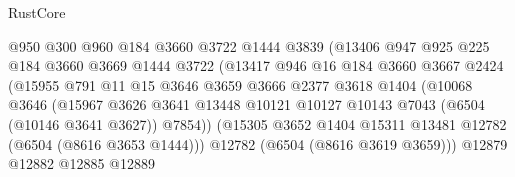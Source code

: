 \begin{lexlean}{RustCore}
\begin{coremodule}
                                @950
                                @300
                                @960
                                @184
                                @3660
                                @3722
                                @1444
                                @3839
                                (@13406
                                  @947
                                  @925
                                  @225
                                  @184
                                  @3660
                                  @3669
                                  @1444
                                  @3722
                                  (@13417
                                    @946
                                    @16
                                    @184
                                    @3660
                                    @3667
                                    @2424
                                    (@15955
                                      @791
                                      @11
                                      @15
                                      @3646
                                      @3659
                                      @3666
                                      @2377
                                      @3618
                                      @1404
                                      (@10068
                                        @3646
                                        (@15967
                                          @3626
                                          @3641
                                          @13448
                                          @10121
                                          @10127
                                          @10143
                                          @7043
                                          (@6504 (@10146 @3641 @3627))
                                          @7854))
                                      (@15305
                                        @3652
                                        @1404
                                        @15311
                                        @13481
                                        @12782
                                        (@6504 (@8616 @3653 @1444)))
                                      @12782
                                      (@6504 (@8616 @3619 @3659)))
                                    @12879
                                    @12882
                                    @12885
                                    @12889

\end{coremodule}
\end{lexlean}
